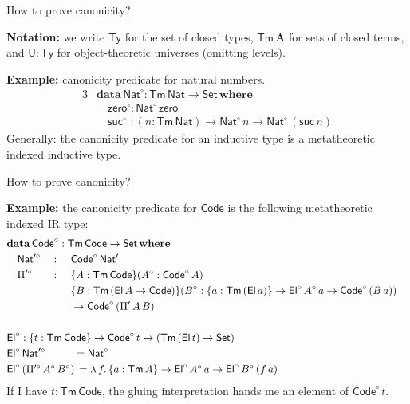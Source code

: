 \documentclass[dvipsnames,aspectratio=169]{beamer}
\newcommand{\ms}[1]{\mathsf{#1}}
\newcommand{\mbf}[1]{\mathbf{#1}}
\newcommand{\bs}[1]{\boldsymbol{#1}}
\newcommand{\data}{\mbf{data}}
\newcommand{\U}{\ms{U}}
\newcommand{\Set}{\ms{Set}}
\newcommand{\where}{\mbf{where}}
\newcommand{\Nat}{\ms{Nat}}
\newcommand{\zero}{\ms{zero}}
\newcommand{\suc}{\ms{suc}}
\newcommand{\El}{\ms{El}}
\newcommand{\Code}{\ms{Code}}
\newcommand{\Ty}{\ms{Ty}}
\newcommand{\Tm}{\ms{Tm}}
\newcommand{\w}{\circ}
\begin{document}
\begin{frame}{How to prove canonicity?}

\textbf{Notation:} we write $\bs{\Ty}$ for the set of closed types, $\bs{\Tm\,A}$ for sets of closed terms,
  and $\bs{\U : \Ty}$ for object-theoretic universes (omitting levels).
\vspace{1em}

\textbf{Example:} canonicity predicate for natural numbers.
\begin{alignat*}{3}
  &\data\,\Nat^\w : \Tm\,\Nat \to \Set\,\where\\
  & \quad \zero^\w : \Nat^\w\,\zero\\
  & \quad \suc^\w\,\,: (n : \Tm\,\Nat) \to \Nat^\w\,n \to \Nat^\w\,(\suc\,n)
\end{alignat*}
Generally: the canonicity predicate for an inductive type is a \alert{metatheoretic indexed inductive type}.


\end{frame}

\begin{frame}{How to prove canonicity?}

\textbf{Example:} the canonicity predicate for $\Code$ is the following \alert{metatheoretic indexed IR type}:
\begin{alignat*}{4}
  &\rlap{$\data\,\Code^\w : \Tm\,\Code \to \Set\,\where$}\\
  &\quad\Nat'^\w &&: \,\,&& \Code^\w\,\Nat'\\
  &\quad\Pi'^\w  &&: \,\,&&\{A : \Tm\,\Code\}(A^\w : \Code^\w\,A)\\
  &\quad         &&  && \{B : \Tm\,(\El\,A \to \Code)\}(B^\w : \{a : \Tm\,(\El\,a)\} \to \El^\w\,A^\w\,a \to \Code^\w\,(B\,a))\\
  &\quad         &&  && \to \Code^\w\,(\Pi'\,A\,B)\\
  &\rlap{}\\
  &\rlap{$\El^\w : \{t : \Tm\,\Code\} \to \Code^\w\,t \to (\Tm\,(\El\,t) \to \Set)$}\\
  &\rlap{$\El^\w\,\Nat'^\w \hspace{2.7em}= \Nat^\w$}  \\
  &\rlap{$\El^\w\,(\Pi'^\w\,A^\w\,B^\w)\,= \lambda\,f.\,\{a : \Tm\,A\} \to \El^\w\,A^\w\,a \to \El^\w\,B^\w\,(f\,a)$}
\end{alignat*}
If I have $t : \Tm\,\Code$, the gluing interpretation hands me an element of $\Code^\w\,t$.

\end{frame}
\end{document}
